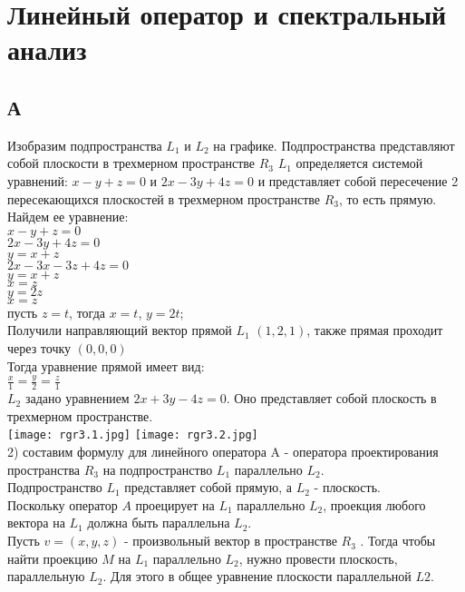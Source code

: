\documentclass{article}
\begin{document}
\newpage
    \section{Линейный оператор и спектральный анализ}
    \subsection{А}
    Изобразим подпространства $L_1$ и $L_2$ на графике. Подпространства представляют собой плоскости в трехмерном пространстве $R_3$  $L_1$ определяется системой уравнений: $x-y+z=0$ и $2x - 3y+4z=0$ и представляет собой пересечение 2 пересекающихся плоскостей в трехмерном пространстве $R_3$, то есть прямую. Найдем ее уравнение:\\
    $x-y+z=0$ \\
    $2x-3y+4z=0$\\
    $y = x+z$\\
    $2x-3x-3z+4z=0$\\
    $y=x+z$\\
    $x=z$\\
    $y=2z$\\
    $x=z$\\
    пусть $z=t$, тогда $x = t$, $y = 2t$; \\
    Получили направляющий вектор прямой $L_1$ $(1, 2, 1)$, также прямая проходит через точку $(0, 0, 0)$\\
    Тогда уравнение прямой имеет вид:\\
    $\frac{x}{1}=\frac{y}{2}=\frac{z}{1}$\\
    $L_2$ задано уравнением $2x+3y-4z=0$. Оно представляет собой плоскость в трехмерном пространстве. \\
    \texttt{[image: rgr3.1.jpg]}
    \texttt{[image: rgr3.2.jpg]}\\
    2) составим формулу для линейного оператора A - оператора проектирования пространства $R_3$ на подпространство $L_1$ параллельно $L_2$. \\
    Подпространство $L_1$ представляет собой прямую, а $L_2$ - плоскость. \\
    Поскольку оператор $A$ проецирует на $L_1$ параллельно $L_2$, проекция любого вектора на $L_1$ должна быть параллельна $L_2$. \\
    Пусть $v=(x, y, z)$ - произвольный вектор в пространстве $R_3$ . Тогда чтобы найти проекцию $M$ на $L_1$ параллельно $L_2$, нужно провести плоскость, параллельную $L_2$. Для этого в общее уравнение плоскости параллельной $L2$. \\
\end{document}
